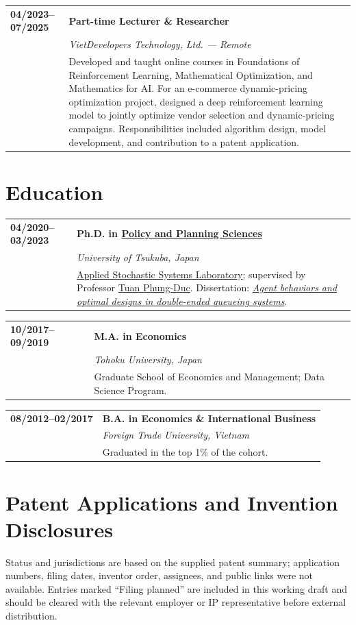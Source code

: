 \documentclass[10pt,a4paper]{article}
\makeatletter
\newcommand{\cventry}[4]{%
  \Needspace{4\baselineskip}%
  \begin{tabularx}{\textwidth}{@{}>{\raggedright\arraybackslash\sffamily\bfseries\color{Teal}}p{0.175\textwidth}X@{}}
    #1 & \textbf{#2} \\
       & \textit{#3} \\
       & {\small #4}
  \end{tabularx}\vspace{5pt}
}
\makeatother
\begin{document}
\cventry{04/2023--07/2025}
  {Part-time Lecturer \& Researcher}
  {VietDevelopers Technology, Ltd. — Remote}
  {Developed and taught online courses in Foundations of Reinforcement Learning, Mathematical Optimization, and Mathematics for AI. For an e-commerce dynamic-pricing optimization project, designed a deep reinforcement learning model to jointly optimize vendor selection and dynamic-pricing campaigns. Responsibilities included algorithm design, model development, and contribution to a patent application.}

\section{Education}
\cventry{04/2020--03/2023}
  {Ph.D. in \href{https://www.sk.tsukuba.ac.jp/PPS/en/}{Policy and Planning Sciences}}
  {University of Tsukuba, Japan}
  {\href{http://sk.tsukuba.ac.jp/~tuan/lab/en/index.html}{Applied Stochastic Systems Laboratory}; supervised by Professor \href{http://sk.tsukuba.ac.jp/~tuan/}{Tuan Phung-Duc}. Dissertation: \href{https://tsukuba.repo.nii.ac.jp/record/2008106/files/DA010775.pdf}{\emph{Agent behaviors and optimal designs in double-ended queueing systems}}.}

\cventry{10/2017--09/2019}
  {M.A. in Economics}
  {Tohoku University, Japan}
  {Graduate School of Economics and Management; Data Science Program.}

\cventry{08/2012--02/2017}
  {B.A. in Economics \& International Business}
  {Foreign Trade University, Vietnam}
  {Graduated in the top 1\% of the cohort.}

\section{Patent Applications and Invention Disclosures}
\begingroup
\setlength{\fboxsep}{7pt}
\noindent\colorbox{WarmPale}{%
  \parbox{\dimexpr\textwidth-2\fboxsep\relax}{%
    \footnotesize\color{Muted}
    Status and jurisdictions are based on the supplied patent summary; application numbers, filing dates, inventor order, assignees, and public links were not available. Entries marked ``Filing planned'' are included in this working draft and should be cleared with the relevant employer or IP representative before external distribution.
  }%
}
\endgroup
\end{document}
